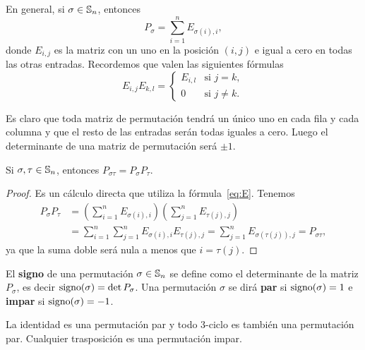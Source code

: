 
En general, si $\sigma\in\mathbb{S}_n$, entonces
\[
P_\sigma=\sum_{i=1}^n E_{\sigma(i),i},
\]
donde $E_{i,j}$ es la matriz con un uno en la posición $(i,j)$ e igual a cero en todas las otras entradas. Recordemos que valen las siguientes fórmulas
\begin{equation}
\label{eq:E}	
E_{i,j}E_{k,l}=\begin{cases}
E_{i,l} & \text{si $j=k$},\\
0 & \text{si $j\ne k$}.
\end{cases}
\end{equation}

Es claro que toda matriz de permutación tendrá un único uno en cada fila y cada columna y que el resto de las entradas serán todas iguales a cero. Luego
el determinante de una matriz de permutación será $\pm1$. 

\begin{proposition}
Si $\sigma,\tau\in\mathbb{S}_n$, entonces $P_{\sigma\tau}=P_\sigma P_\tau$. 
\end{proposition}

\begin{proof}
Es un cálculo directa que utiliza la fórmula~\eqref{eq:E}. 
Tenemos
\begin{align*}
P_\sigma P_\tau &=\left(\sum_{i=1}^n E_{\sigma(i),i}\right)\left(\sum_{j=1}^nE_{\tau{(j)},j}\right)\\
&=\sum_{i=1}^n\sum_{j=1}^n E_{\sigma(i),i}E_{\tau(j),j}
=\sum_{j=1}^n E_{\sigma(\tau(j)),j}=P_{\sigma\tau},
\end{align*}
ya que la suma doble será nula a menos que $i=\tau(j)$.  
\end{proof}
  
\begin{definition}
	El \textbf{signo} de una permutación $\sigma\in\mathbb{S}_n$ se define como el determinante de la matriz $P_\sigma$, es decir $\operatorname{signo}(\sigma)=\det P_\sigma$. 
	Una permutación $\sigma$ se dirá \textbf{par} si $\operatorname{signo}(\sigma)=1$ e \textbf{impar} si $\operatorname{signo}(\sigma)=-1$. 
\end{definition}

\begin{examples}
La identidad es una permutación par y todo 3-ciclo es también una permutación par. Cualquier trasposición es una permutación impar.   
\end{examples}


